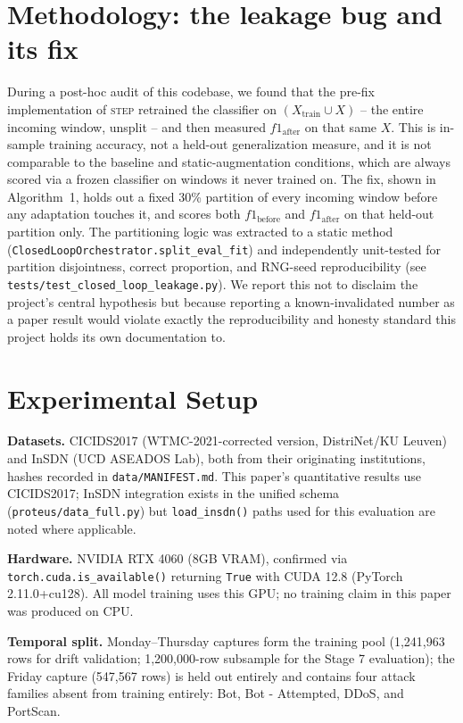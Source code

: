 \documentclass[conference]{IEEEtran}
\begin{document}
\section{Methodology: the leakage bug and its fix}
\label{sec:leakage}

During a post-hoc audit of this codebase, we found that the pre-fix implementation of
\textsc{step} retrained the classifier on $(X_{\text{train}} \cup X)$ -- the entire incoming
window, unsplit -- and then measured $f1_{\text{after}}$ on that same $X$. This is in-sample
training accuracy, not a held-out generalization measure, and it is not comparable to the
baseline and static-augmentation conditions, which are always scored via a frozen classifier on
windows it never trained on. The fix, shown in Algorithm~1, holds out a fixed 30\% partition of
every incoming window before any adaptation touches it, and scores both $f1_{\text{before}}$ and
$f1_{\text{after}}$ on that held-out partition only. The partitioning logic was extracted to a
static method (\texttt{ClosedLoopOrchestrator.split\_eval\_fit}) and independently unit-tested
for partition disjointness, correct proportion, and RNG-seed reproducibility (see
\texttt{tests/test\_closed\_loop\_leakage.py}). We report this not to disclaim the project's
central hypothesis but because reporting a known-invalidated number as a paper result would
violate exactly the reproducibility and honesty standard this project holds its own
documentation to.

\section{Experimental Setup}
\label{sec:setup}

\textbf{Datasets.} CICIDS2017 (WTMC-2021-corrected version, DistriNet/KU Leuven) and InSDN
(UCD ASEADOS Lab), both from their originating institutions, hashes recorded in
\texttt{data/MANIFEST.md}. This paper's quantitative results use CICIDS2017; InSDN integration
exists in the unified schema (\texttt{proteus/data\_full.py}) but \texttt{load\_insdn()} paths
used for this evaluation are noted where applicable.

\textbf{Hardware.} NVIDIA RTX 4060 (8GB VRAM), confirmed via \texttt{torch.cuda.is\_available()}
returning \texttt{True} with CUDA 12.8 (PyTorch 2.11.0+cu128). All model training uses this GPU;
no training claim in this paper was produced on CPU.

\textbf{Temporal split.} Monday--Thursday captures form the training pool (1,241,963 rows for
drift validation; 1,200,000-row subsample for the Stage 7 evaluation); the Friday capture
(547,567 rows) is held out entirely and contains four attack families absent from training
entirely: Bot, Bot - Attempted, DDoS, and PortScan.
\end{document}
